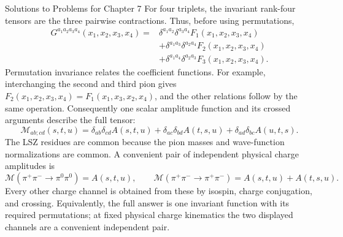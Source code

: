 \begin{bankssolutions}{Solutions to Problems for Chapter 7}
For four triplets, the invariant rank-four tensors are the three pairwise
contractions.  Thus, before using permutations,
\begin{align*}
 G^{a_1a_2a_3a_4}(x_1,x_2,x_3,x_4)
 ={}&\delta^{a_1a_2}\delta^{a_3a_4}F_1(x_1,x_2,x_3,x_4)\\
 &+\delta^{a_1a_3}\delta^{a_2a_4}F_2(x_1,x_2,x_3,x_4)\\
 &+\delta^{a_1a_4}\delta^{a_2a_3}F_3(x_1,x_2,x_3,x_4).
\end{align*}
Permutation invariance relates the coefficient functions.  For example,
interchanging the second and third pion gives
$F_2(x_1,x_2,x_3,x_4)=F_1(x_1,x_3,x_2,x_4)$, and the other relations follow
by the same operation.  Consequently one scalar amplitude function and its
crossed arguments describe the full tensor:
\begin{equation*}
 \mathcal M_{ab;cd}(s,t,u)
 =\delta_{ab}\delta_{cd}A(s,t,u)
 +\delta_{ac}\delta_{bd}A(t,s,u)
 +\delta_{ad}\delta_{bc}A(u,t,s).
\end{equation*}
The LSZ residues are common because the pion masses and wave-function
normalizations are common.  A convenient pair of independent physical
charge amplitudes is
\[
 \mathcal M(\pi^+\pi^-\to\pi^0\pi^0)=A(s,t,u),
 \qquad
 \mathcal M(\pi^+\pi^-\to\pi^+\pi^-)
 =A(s,t,u)+A(t,s,u).
\]
Every other charge channel is obtained from these by isospin, charge
conjugation, and crossing.  Equivalently, the full answer is one invariant
function with its required permutations; at fixed physical charge
kinematics the two displayed channels are a convenient independent pair.


\end{bankssolutions}
